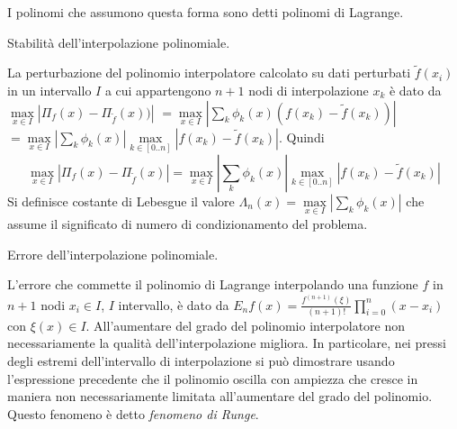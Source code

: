 \documentclass[answers, a4paper]{exam}
\begin{document}
\begin{questions}
\begin{solution}
		I polinomi che assumono questa forma sono detti polinomi di Lagrange.
	\end{solution}
	\question Stabilità dell'interpolazione polinomiale.
	\begin{solution}
		La perturbazione del polinomio interpolatore calcolato su dati perturbati $\tilde{f}(x_i)$ in un intervallo $I$ a cui appartengono $n + 1$ nodi di interpolazione $x_k$ è dato da $\max\limits_{x \in I} |\Pi_f(x) - \Pi_{\tilde{f}} (x))|$
		$ = \max\limits_{x \in I} |\sum_k \phi_k(x) (f(x_k) - \tilde{f} (x_k))|$
		$ = \max\limits_{x \in I} |\sum_k \phi_k(x)| \max\limits_{k \in [0..n]} |f(x_k) - \tilde{f} (x_k)|$.
		Quindi 
		\begin{equation} 
		\max\limits_{x \in I} |\Pi_f(x) - \Pi_{\tilde{f}} (x)| 
		= \max\limits_{x \in I} |\sum_k \phi_k(x)| \max\limits_{k \in [0..n]} |f(x_k) - \tilde{f} (x_k)|
	\end{equation}
		Si definisce costante di Lebesgue il valore $\Lambda_n(x) =  \max\limits_{x \in I} |\sum_k \phi_k(x)|$ che assume il significato di numero di condizionamento del problema.
	\end{solution}
	\question Errore dell'interpolazione polinomiale.
	\begin{solution}
		L'errore che commette il polinomio di Lagrange interpolando una funzione $f$ in $n + 1$ nodi $x_i \in I$, $I$ intervallo, è dato da $E_n f(x) = \frac{f^{(n + 1)} (\xi)}{(n + 1)!} \prod\limits_{i = 0}^{n} (x - x_i)$ con $\xi(x) \in I$.
		All'aumentare del grado del polinomio interpolatore non necessariamente la qualità dell'interpolazione migliora.
		In particolare, nei pressi degli estremi dell'intervallo di interpolazione si può dimostrare usando l'espressione precedente che il polinomio oscilla con ampiezza che cresce in maniera non necessariamente limitata all'aumentare del grado del polinomio.
		Questo fenomeno è detto \textit{fenomeno di Runge}.
	\end{solution}
	
	
	

\end{questions}
\end{document}
